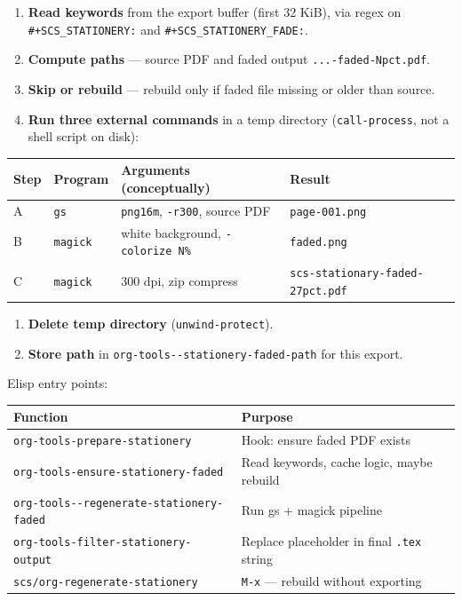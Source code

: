 \documentclass[11pt]{article}
\begin{document}
\begin{enumerate}
\item \textbf{Read keywords} from the export buffer (first 32 KiB), via regex on
\texttt{\#+SCS\_STATIONERY:} and \texttt{\#+SCS\_STATIONERY\_FADE:}.
\item \textbf{Compute paths} — source PDF and faded output \texttt{...-faded-Npct.pdf}.
\item \textbf{Skip or rebuild} — rebuild only if faded file missing or older than source.
\item \textbf{Run three external commands} in a temp directory (\texttt{call-process}, not a
shell script on disk):
\end{enumerate}

\begin{center}
\begin{tabular}{llll}
Step & Program & Arguments (conceptually) & Result\\
\hline
A & \texttt{gs} & \texttt{png16m}, \texttt{-r300}, source PDF & \texttt{page-001.png}\\
B & \texttt{magick} & white background, \texttt{-colorize N\%} & \texttt{faded.png}\\
C & \texttt{magick} & 300 dpi, zip compress & \texttt{scs-stationary-faded-27pct.pdf}\\
\end{tabular}
\end{center}

\begin{enumerate}
\item \textbf{Delete temp directory} (\texttt{unwind-protect}).
\item \textbf{Store path} in \texttt{org-tools-{}-{}stationery-faded-path} for this export.
\end{enumerate}

Elisp entry points:

\begin{center}
\begin{tabular}{ll}
Function & Purpose\\
\hline
\texttt{org-tools-prepare-stationery} & Hook: ensure faded PDF exists\\
\texttt{org-tools-ensure-stationery-faded} & Read keywords, cache logic, maybe rebuild\\
\texttt{org-tools-{}-{}regenerate-stationery-faded} & Run gs + magick pipeline\\
\texttt{org-tools-filter-stationery-output} & Replace placeholder in final \texttt{.tex} string\\
\texttt{scs/org-regenerate-stationery} & \texttt{M-x} — rebuild without exporting\\
\end{tabular}
\end{center}
\end{document}

